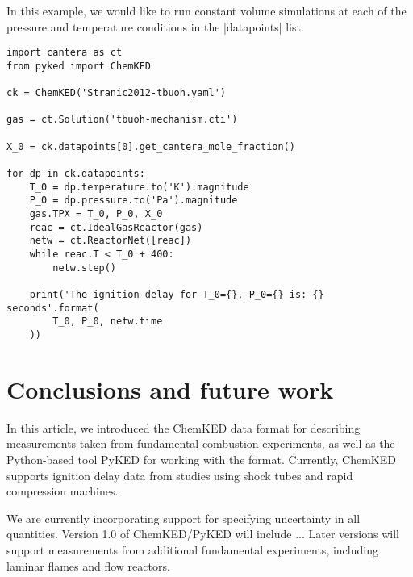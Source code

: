 \documentclass[12pt]{ussci}
\newcommand\ck{ChemKED}
\newcommand\pk{PyKED}
\begin{document}
In this example, we would like to run constant volume simulations at each of the
pressure and temperature conditions in the \yaml|datapoints| list.

\begin{verbatim}
import cantera as ct
from pyked import ChemKED

ck = ChemKED('Stranic2012-tbuoh.yaml')

gas = ct.Solution('tbuoh-mechanism.cti')

X_0 = ck.datapoints[0].get_cantera_mole_fraction()

for dp in ck.datapoints:
    T_0 = dp.temperature.to('K').magnitude
    P_0 = dp.pressure.to('Pa').magnitude
    gas.TPX = T_0, P_0, X_0
    reac = ct.IdealGasReactor(gas)
    netw = ct.ReactorNet([reac])
    while reac.T < T_0 + 400:
        netw.step()

    print('The ignition delay for T_0={}, P_0={} is: {} seconds'.format(
        T_0, P_0, netw.time
    ))
\end{verbatim}
\section{Conclusions and future work}
%

In this article, we introduced the \ck{} data format for describing measurements
taken from fundamental combustion experiments, as well as the Python-based tool
\pk{} for working with the format. Currently, \ck{} supports ignition delay data
from studies using shock tubes and rapid compression machines.

We are currently incorporating support for specifying uncertainty in all quantities.
Version 1.0 of \ck{}\slash \pk{} will include ...
Later versions will support measurements from additional fundamental experiments,
including laminar flames and flow reactors.

\printbibliography
\end{document}
